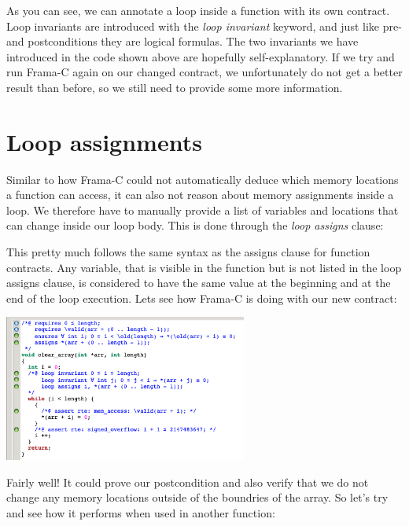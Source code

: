 
As you can see, we can annotate a loop inside a function with its own contract. Loop invariants are introduced with the \emph{loop invariant} keyword, and just like pre- and postconditions they are logical formulas. The two invariants we have introduced in the code shown above are hopefully self-explanatory. If we try and run Frama-C again on our changed contract, we unfortunately do not get a better result than before, so we still need to provide some more information. 

\section{Loop assignments}

Similar to how Frama-C could not automatically deduce which memory locations a function can access, it can also not reason about memory assignments inside a loop. We therefore have to manually provide a list of variables and locations that can change inside our loop body. This is done through the \emph{loop assigns} clause:


This pretty much follows the same syntax as the assigns clause for function contracts. Any variable, that is visible in the function but is not listed in the loop assigns clause, is considered to have the same value at the beginning and at the end of the loop execution. Lets see how Frama-C is doing with our new contract:

\begin{center}
    \includegraphics[width=0.6\textwidth]{images/frama_c_clear_array_assigns.png}
\end{center}

Fairly well! It could prove our postcondition and also verify that we do not change any memory locations outside of the boundries of the array. So let's try and see how it performs when used in another function: 

